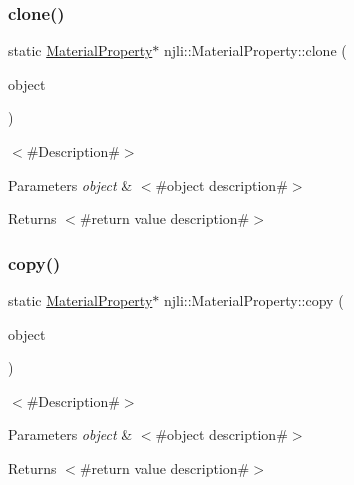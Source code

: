 \subsubsection{\texorpdfstring{clone()}{clone()}}
{\footnotesize\ttfamily static \mbox{\hyperlink{classnjli_1_1_material_property}{Material\+Property}}$\ast$ njli\+::\+Material\+Property\+::clone (\begin{DoxyParamCaption}\item[{const \mbox{\hyperlink{classnjli_1_1_material_property}{Material\+Property}} \&}]{object }\end{DoxyParamCaption})\hspace{0.3cm}{\ttfamily [static]}}

$<$\#\+Description\#$>$


\begin{DoxyParams}{Parameters}
{\em object} & $<$\#object description\#$>$\\
\hline
\end{DoxyParams}
\begin{DoxyReturn}{Returns}
$<$\#return value description\#$>$ 
\end{DoxyReturn}
\mbox{\label{classnjli_1_1_material_property_a8347b1bfe6959984904ef14d113bad53}} 
\subsubsection{\texorpdfstring{copy()}{copy()}}
{\footnotesize\ttfamily static \mbox{\hyperlink{classnjli_1_1_material_property}{Material\+Property}}$\ast$ njli\+::\+Material\+Property\+::copy (\begin{DoxyParamCaption}\item[{const \mbox{\hyperlink{classnjli_1_1_material_property}{Material\+Property}} \&}]{object }\end{DoxyParamCaption})\hspace{0.3cm}{\ttfamily [static]}}

$<$\#\+Description\#$>$


\begin{DoxyParams}{Parameters}
{\em object} & $<$\#object description\#$>$\\
\hline
\end{DoxyParams}
\begin{DoxyReturn}{Returns}
$<$\#return value description\#$>$ 
\end{DoxyReturn}
\mbox{\label{classnjli_1_1_material_property_a83a8876ae63b92804004cf3febe76573}} 
